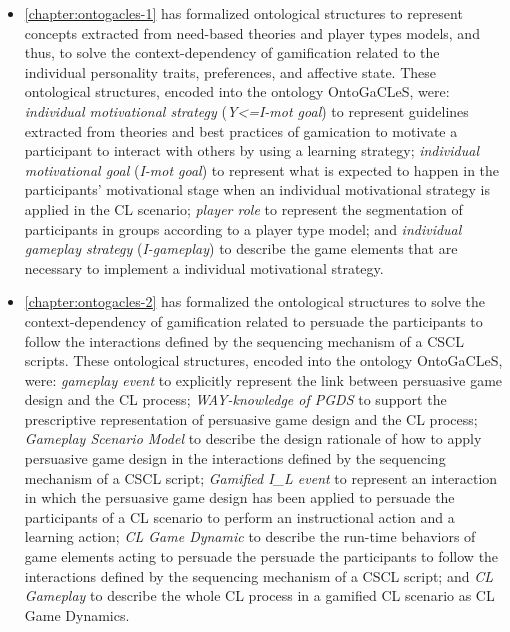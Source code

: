 \begin{itemize}
\item
\autoref{chapter:ontogacles-1} has formalized ontological structures to represent concepts extracted from need-based theories and player types models, and thus, to solve the context-dependency of gamification related to the individual personality traits, preferences, and affective state. These ontological structures, encoded into the ontology OntoGaCLeS, were: \emph{individual motivational strategy} (\emph{Y<=I-mot goal}) to represent guidelines extracted from theories and best practices of gamication to motivate a participant to interact with others by using a learning strategy; \emph{individual motivational goal} (\emph{I-mot goal}) to represent what is expected to happen in the participants' motivational stage when an individual motivational strategy is applied in the CL scenario; \emph{player role} to represent the segmentation of participants in groups according to a player type model; and \emph{individual gameplay strategy} (\emph{I-gameplay}) to describe the game elements that are necessary to implement a individual motivational strategy.

\item
\autoref{chapter:ontogacles-2} has formalized the ontological structures to solve the context-dependency of gamification related to persuade the participants to follow the interactions defined by the sequencing mechanism of a CSCL scripts. These ontological structures, encoded into the ontology OntoGaCLeS, were: \emph{gameplay event} to explicitly represent the link between persuasive game design and the CL process; \emph{WAY-knowledge of PGDS} to support the prescriptive representation of persuasive game design and the CL process; \emph{Gameplay Scenario Model} to describe the design rationale of how to apply persuasive game design in the interactions defined by the sequencing mechanism of a CSCL script; \emph{Gamified I\_L event} to represent an interaction in which the persuasive game design has been applied to persuade the participants of a CL scenario to perform an instructional action and a learning action; \emph{CL Game Dynamic} to describe the run-time behaviors of game elements acting to persuade the persuade the participants to follow the interactions defined by the sequencing mechanism of a CSCL script; and \emph{CL Gameplay} to describe the whole CL process in a gamified CL scenario as CL Game Dynamics.


\end{itemize}
